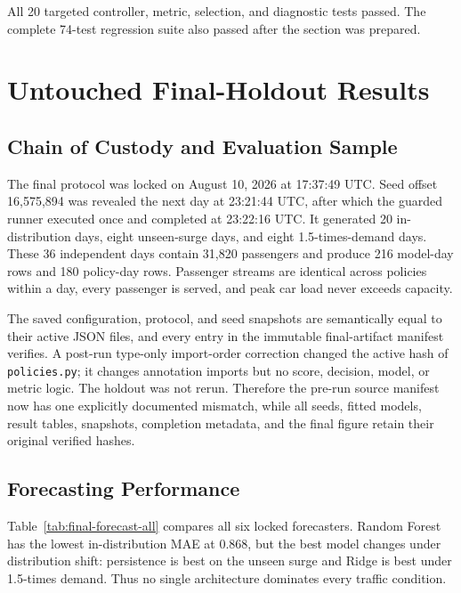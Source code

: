 \documentclass[12pt]{article}
\begin{document}
All 20 targeted controller, metric, selection, and diagnostic tests passed.
The complete 74-test regression suite also passed after the section was
prepared.

\section{Untouched Final-Holdout Results}
\label{sec:final-results}

\subsection{Chain of Custody and Evaluation Sample}

The final protocol was locked on August 10, 2026 at 17:37:49 UTC. Seed offset
16,575,894 was revealed the next day at 23:21:44 UTC, after which the guarded
runner executed once and completed at 23:22:16 UTC. It generated 20
in-distribution days, eight unseen-surge days, and eight 1.5-times-demand days.
These 36 independent days contain 31,820 passengers and produce 216 model-day
rows and 180 policy-day rows. Passenger streams are identical across policies
within a day, every passenger is served, and peak car load never exceeds
capacity.

The saved configuration, protocol, and seed snapshots are semantically equal
to their active JSON files, and every entry in the immutable final-artifact
manifest verifies. A post-run type-only import-order correction changed the
active hash of \texttt{policies.py}; it changes annotation imports but no score,
decision, model, or metric logic. The holdout was not rerun. Therefore the
pre-run source manifest now has one explicitly documented mismatch, while all
seeds, fitted models, result tables, snapshots, completion metadata, and the
final figure retain their original verified hashes.

\subsection{Forecasting Performance}

Table~\ref{tab:final-forecast-all} compares all six locked forecasters. Random
Forest has the lowest in-distribution MAE at 0.868, but the best model changes
under distribution shift: persistence is best on the unseen surge and Ridge is
best under 1.5-times demand. Thus no single architecture dominates every
traffic condition.
\end{document}
